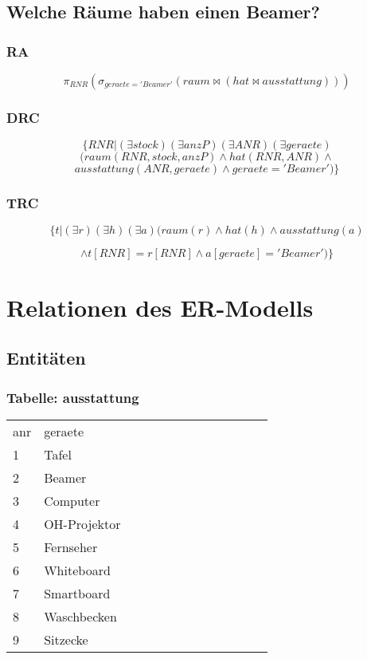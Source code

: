 \documentclass[fleqn]{scrartcl}
\begin{document}
\subsection{Welche Räume haben einen Beamer?}
\subsubsection{RA}
\[ \pi_{RNR}(\sigma_{geraete='Beamer'} ( raum \bowtie (hat \bowtie ausstattung ))) \]
\subsubsection{DRC}
\[ \{ RNR|(\exists stock)(\exists anzP )(\exists ANR )(\exists geraete)\]
\[(raum(RNR,stock,anzP) \wedge hat (RNR,ANR) \wedge \] 
\[ ausstattung(ANR,geraete) \wedge geraete = 'Beamer')\}  \]

\subsubsection{TRC}
 
\[\{ t|(\exists r )(\exists h )(\exists a )(raum(r) \wedge hat(h) \wedge ausstattung(a)\] 

\[\wedge t[RNR]=r[RNR] \wedge a[geraete] = 'Beamer')\}\]


\section{Relationen des ER-Modells}
\subsection{Entitäten}
\subsubsection{Tabelle: ausstattung}
\begin{tabular}{|l|l|l|l|l|l|l|l|l|l|l|l|l|}\toprule
\rowcolor{green!20}
\multicolumn{2}{|c|}{
ausstattung
}\\\midrule
\rowcolor{yellow!30}anr & geraete  \\\midrule
1& Tafel  \\ 
2& Beamer  \\ 
3& Computer  \\ 
4& OH-Projektor  \\ 
5& Fernseher  \\ 
6& Whiteboard  \\ 
7& Smartboard  \\ 
8& Waschbecken  \\ 
9& Sitzecke  \\ 
\bottomrule
\end{tabular}
\end{document}
